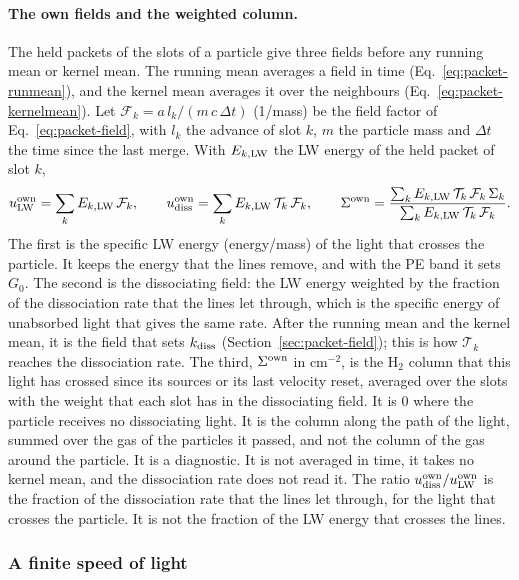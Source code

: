 \paragraph{The own fields and the weighted column.} The held packets of the
slots of a particle give three fields before any running mean or kernel mean.
The running mean averages a field in time (Eq.~\eqref{eq:packet-runmean}), and
the kernel mean averages it over the neighbours
(Eq.~\eqref{eq:packet-kernelmean}). Let $\mathcal F_k=a\,l_k/(m\,c\,\Delta t)$
(1/mass) be the field factor of Eq.~\eqref{eq:packet-field}, with $l_k$ the
advance of slot $k$, $m$ the particle mass and $\Delta t$ the time since the
last merge.
With $E_{k,{\rm LW}}$ the LW energy of the held packet of slot $k$,
\begin{equation}
  u_{\rm LW}^{\rm own}=\sum_k E_{k,{\rm LW}}\,\mathcal F_k, \qquad
  u_{\rm diss}^{\rm own}=\sum_k E_{k,{\rm LW}}\,\mathcal T_k\,\mathcal F_k, \qquad
  \Sigma^{\rm own}=\frac{\sum_k E_{k,{\rm LW}}\,\mathcal T_k\,\mathcal F_k\,\Sigma_k}
  {\sum_k E_{k,{\rm LW}}\,\mathcal T_k\,\mathcal F_k}.
  \label{eq:h2-own}
\end{equation}
The first is the specific LW energy (energy/mass) of the light that crosses
the particle. It keeps the energy that the lines remove, and with the PE band
it sets $G_0$. The second is the dissociating field: the LW energy weighted by
the fraction of the dissociation rate that the lines let through, which is the
specific energy of unabsorbed light that gives the same rate.
After the running mean and the kernel mean, it is the field that sets
$k_{\rm diss}$ (Section~\ref{sec:packet-field}); this is how $\mathcal T_k$
reaches the dissociation rate. The third,
$\Sigma^{\rm own}$ in cm$^{-2}$, is the H$_2$ column that this light has crossed
since its sources or its last velocity reset, averaged over the slots with the
weight that each slot has in the dissociating field. It is $0$ where the
particle receives no dissociating light. It is the column along the path of
the light, summed over the gas of the particles it passed, and not the column
of the gas around the particle. It is a diagnostic. It is not averaged in
time, it takes no kernel mean, and the dissociation rate does not read it.
The ratio
$u_{\rm diss}^{\rm own}/u_{\rm LW}^{\rm own}$ is the fraction of the
dissociation rate that the lines let through, for the light that crosses the
particle. It is not the fraction of the LW energy that crosses the lines.

\subsubsection{A finite speed of light}
\label{sec:packet-lightspeed}

